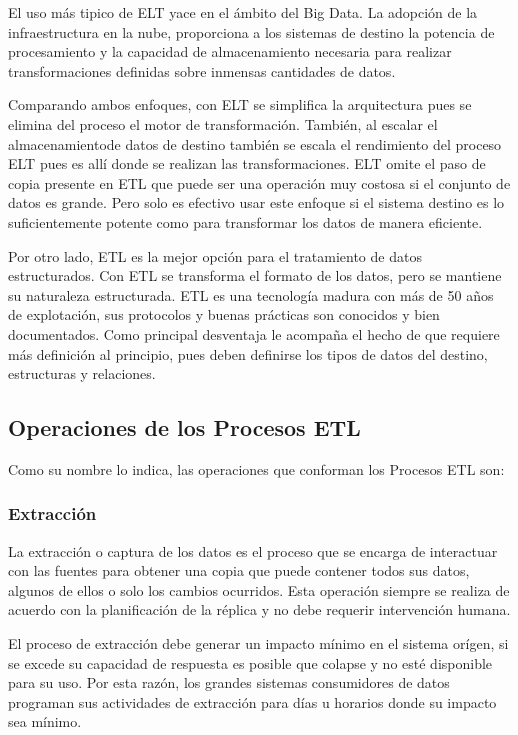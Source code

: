 El uso m\'as tipico de ELT yace en el \'ambito del Big Data\cite{raunakjhawar_ETL_microsoft}. La adopción de la 
infraestructura en la nube, proporciona a los sistemas de destino la potencia de procesamiento y la capacidad de almacenamiento
necesaria para realizar transformaciones definidas sobre inmensas cantidades de datos.

Comparando ambos enfoques, con ELT se simplifica la arquitectura pues se elimina del proceso el motor de transformación. 
Tambi\'en, al escalar el almacenamientode datos de destino también se escala el rendimiento del proceso ELT pues es all\'i
donde se realizan las transformaciones. ELT omite el paso de copia presente en ETL que puede ser una operaci\'on muy costosa 
si el conjunto de datos es grande. Pero solo es efectivo usar este enfoque si el sistema destino es lo suficientemente
potente como para transformar los datos de manera eficiente.

Por otro lado, ETL es la mejor opci\'on para el tratamiento de datos estructurados\cite{etl_vs_elt_amazon}. Con 
ETL se transforma el formato de los datos, pero se mantiene su naturaleza estructurada. ETL es una tecnología madura 
con m\'as de 50 años de explotaci\'on, sus protocolos y buenas pr\'acticas son conocidos y bien documentados. Como principal 
desventaja le acompaña el hecho de que requiere m\'as definici\'on al principio, pues deben definirse los tipos de datos 
del destino, estructuras y relaciones.

\subsection{Operaciones de los Procesos ETL}

Como su nombre lo indica, las operaciones que conforman los Procesos ETL son:

\subsubsection{Extracci\'on}

La extracción o captura de los datos es el proceso que se encarga de interactuar con las fuentes para 
obtener una copia que puede contener todos sus datos, algunos de ellos o solo los cambios ocurridos. Esta operaci\'on 
siempre se realiza de acuerdo con la planificación de la réplica y no debe requerir intervención humana. 

El proceso de extracci\'on debe generar un impacto m\'inimo en el sistema or\'igen, si se excede su capacidad de respuesta 
es posible que colapse y no est\'e disponible para su uso. Por esta raz\'on, los grandes 
sistemas consumidores de datos programan sus actividades de extracci\'on para d\'ias u horarios donde su impacto sea 
m\'inimo. 

